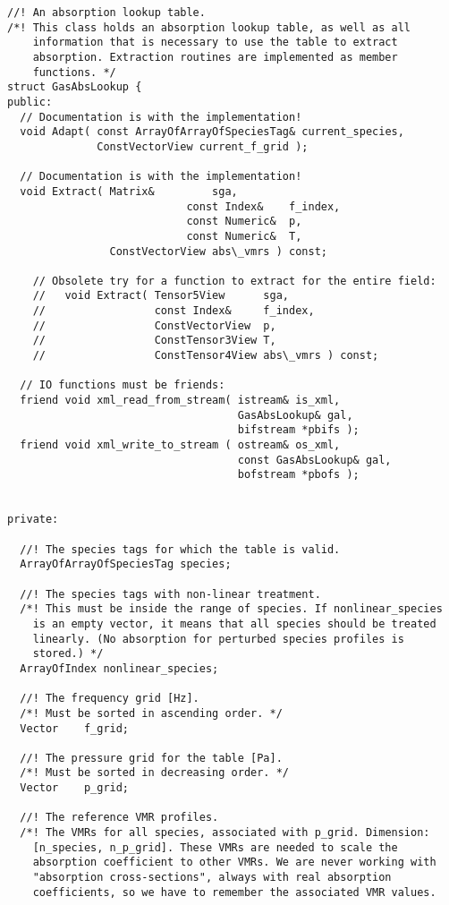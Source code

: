 \begin{lstlisting}
//! An absorption lookup table.
/*! This class holds an absorption lookup table, as well as all
    information that is necessary to use the table to extract
    absorption. Extraction routines are implemented as member
    functions. */
struct GasAbsLookup {
public:
  // Documentation is with the implementation!
  void Adapt( const ArrayOfArrayOfSpeciesTag& current_species,
              ConstVectorView current_f_grid );

  // Documentation is with the implementation!
  void Extract( Matrix&         sga,
                            const Index&    f_index,
                            const Numeric&  p,
                            const Numeric&  T,
                ConstVectorView abs\_vmrs ) const;

    // Obsolete try for a function to extract for the entire field:
    //   void Extract( Tensor5View      sga,
    //                 const Index&     f_index,
    //                 ConstVectorView  p,
    //                 ConstTensor3View T,
    //                 ConstTensor4View abs\_vmrs ) const;

  // IO functions must be friends:
  friend void xml_read_from_stream( istream& is_xml,
                                    GasAbsLookup& gal,
                                    bifstream *pbifs );
  friend void xml_write_to_stream ( ostream& os_xml,
                                    const GasAbsLookup& gal,
                                    bofstream *pbofs );


private:

  //! The species tags for which the table is valid.
  ArrayOfArrayOfSpeciesTag species; 

  //! The species tags with non-linear treatment.
  /*! This must be inside the range of species. If nonlinear_species
    is an empty vector, it means that all species should be treated
    linearly. (No absorption for perturbed species profiles is 
    stored.) */
  ArrayOfIndex nonlinear_species; 

  //! The frequency grid [Hz].
  /*! Must be sorted in ascending order. */
  Vector    f_grid;

  //! The pressure grid for the table [Pa].
  /*! Must be sorted in decreasing order. */
  Vector    p_grid;  

  //! The reference VMR profiles.
  /*! The VMRs for all species, associated with p_grid. Dimension:
    [n_species, n_p_grid]. These VMRs are needed to scale the
    absorption coefficient to other VMRs. We are never working with
    "absorption cross-sections", always with real absorption 
    coefficients, so we have to remember the associated VMR values. 


\end{lstlisting}
